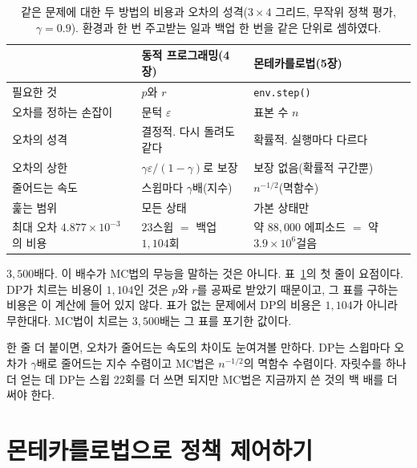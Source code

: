 \documentclass[11pt,a4paper]{article}
\begin{document}
\begin{table}[htbp]
\centering
\caption{같은 문제에 대한 두 방법의 비용과 오차의 성격($3\times4$ 그리드, 무작위 정책 평가,
$\gamma=0.9$). 환경과 한 번 주고받는 일과 백업 한 번을 같은 단위로 셈하였다.}
\label{tab:dp-vs-mc}
\small
\begin{tabular}{@{}lll@{}}
\toprule
 & 동적 프로그래밍(4장) & 몬테카를로법(5장) \\
\midrule
필요한 것            & $p$와 $r$                    & \lstinline|env.step()| \\
오차를 정하는 손잡이 & 문턱 $\varepsilon$           & 표본 수 $n$ \\
오차의 성격          & 결정적. 다시 돌려도 같다     & 확률적. 실행마다 다르다 \\
오차의 상한          & $\gamma\varepsilon/(1-\gamma)$로 보장 & 보장 없음(확률적 구간뿐) \\
줄어드는 속도        & 스윕마다 $\gamma$배(지수)    & $n^{-1/2}$(멱함수) \\
훑는 범위            & 모든 상태                    & 가본 상태만 \\
\midrule
최대 오차 $4.877\times10^{-3}$의 비용 & $23$스윕 $=$ 백업 $1{,}104$회
                                     & 약 $88{,}000$ 에피소드 $=$ 약 $3.9\times10^{6}$걸음 \\
\bottomrule
\end{tabular}
\end{table}

$3{,}500$배다. 이 배수가 MC법의 무능을 말하는 것은 아니다. 표~\ref{tab:dp-vs-mc}의 첫 줄이 요점이다.
DP가 치르는 비용이 $1{,}104$인 것은 $p$와 $r$를 공짜로 받았기 때문이고, 그 표를 구하는 비용은 이
계산에 들어 있지 않다. 표가 없는 문제에서 DP의 비용은 $1{,}104$가 아니라 무한대다. MC법이 치르는
$3{,}500$배는 그 표를 포기한 값이다.

한 줄 더 붙이면, 오차가 줄어드는 속도의 차이도 눈여겨볼 만하다. DP는 스윕마다 오차가 $\gamma$배로
줄어드는 지수 수렴이고 MC법은 $n^{-1/2}$의 멱함수 수렴이다. 자릿수를 하나 더 얻는 데 DP는 스윕
$22$회를 더 쓰면 되지만 MC법은 지금까지 쓴 것의 백 배를 더 써야 한다.

\section{몬테카를로법으로 정책 제어하기}
\label{sec:control}
\end{document}
